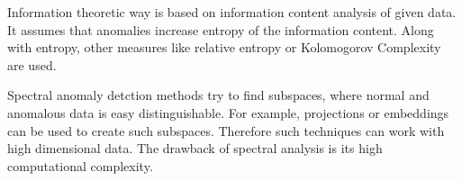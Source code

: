 Information theoretic way is based on information content analysis of given data.
It assumes that anomalies increase entropy of the information content.
Along with entropy, other measures like relative entropy or Kolomogorov Complexity are used.

Spectral anomaly detction methods try to find subspaces, where normal and anomalous data is easy distinguishable.
For example, projections or embeddings can be used to create such subspaces.
Therefore such techniques can work with high dimensional data.
The drawback of spectral analysis is its high computational complexity.   